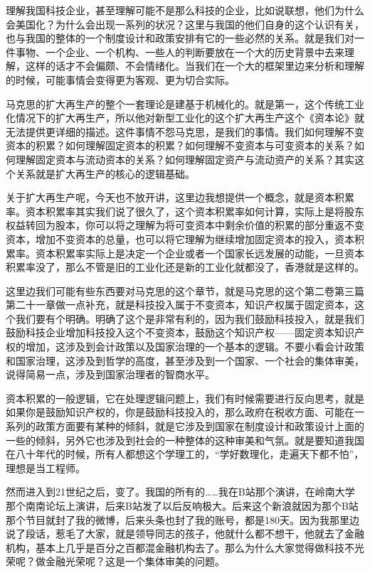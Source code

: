 \documentclass[UTF8, 12pt, a4paper]{ctexrep}
\begin{document}
理解我国科技企业，甚至理解可能不是那么科技的企业，比如说联想，他们为什么会美国化？为什么会出现一系列的状况？这里与我国的他们自身的这个认识有关，也与我国的整体的一个制度设计和政策安排有它的一些必然的关系。就是我们对一件事物、一个企业、一个机构、一些人的判断要放在一个大的历史背景中去来理解，这样的话才不会偏颇、不会情绪化。当我们在一个大的框架里边来分析和理解的时候，可能事情会变得更为客观、更为切合实际。

马克思的扩大再生产的整个一套理论是建基于机械化的。就是第一，这个传统工业化情况下的扩大再生产，所以他对新型工业化的这个扩大再生产这个《资本论》就无法提供更详细的描述。这件事情不怨马克思，是我们的事情。我们如何理解不变资本的积累？如何理解固定资本的积累？如何理解不变资本与可变资本的关系？如何理解固定资本与流动资本的关系？如何理解固定资产与流动资产的关系？其实这个关系就是扩大再生产的核心的逻辑基础。

关于扩大再生产呢，今天也不放开讲，这里边我想提供一个概念，就是资本积累率。资本积累率其实我们说了很久了，这个资本积累率如何计算，实际上是将股东权益转回为股本，你可以将之理解为将可变资本中剩余价值的积累的部分重返不变资本，增加不变资本的总量，也可以将它理解为继续增加固定资本的投入，资本积累率。资本积累率实际上是决定一个企业或者一个国家长远发展的动能，一旦资本积累率没了，那么不管是旧的工业化还是新的工业化就都没了，香港就是这样的。

这里边我们可能有些东西要对马克思的这个章节，就是马克思的这个第二卷第三篇第二十一章做一点补充，就是科技投入属于不变资本，知识产权属于固定资本，这个我们要有个明确。明确了这个是非常有利的，因为我们鼓励科技投入，就是我们鼓励科技企业增加科技投入这个不变资本，鼓励这个知识产权——固定资本知识产权的增加，这涉及到会计政策以及国家治理的一个基本的逻辑。不要小看会计政策和国家治理，这涉及到哲学的高度，甚至涉及到一个国家、一个社会的集体审美，说得简易一点，涉及到国家治理者的智商水平。

资本积累的一般逻辑，它在处理逻辑问题上，我们有时候需要进行反向思考，就是如果你是鼓励知识产权的，你是鼓励科技投入的，那么政府在税收方面、可能在一系列的政策方面要有某种的倾斜，就是它涉及到国家在制度设计和政策设计上面的一些的倾斜，另外它也涉及到社会的一种整体的这种审美和气氛。就是要知道我国在八十年代的时候，所有人都想这个学理工的，“学好数理化，走遍天下都不怕”，理想是当工程师。

然而进入到21世纪之后，变了。我国的所有的……我在B站那个演讲，在岭南大学那个南南论坛上演讲，后来B站发了以后反响极大。后来这个新浪就因为那个B站那个节目就封了我的微博，后来头条也封了我的账号，都是180天。因为我那里边说了段话，惹毛了大家，就是领导同志的孩子，他就什么都不想干，他就去了金融机构，基本上几乎是百分之百都混金融机构去了。那么为什么大家觉得做科技不光荣呢？做金融光荣呢？这是一个集体审美的问题。
\end{document}
